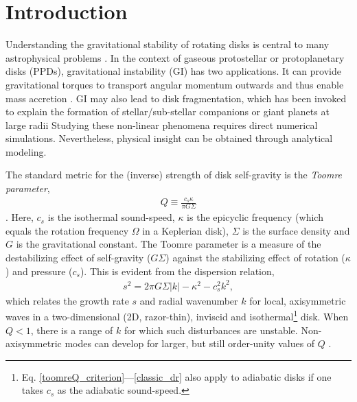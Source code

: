\documentclass[iop, numberedappendix]{emulateapj}
\begin{document}
\section{Introduction}\label{intro} 
Understanding the gravitational stability of rotating disks    
is central to many astrophysical problems {\bf \citep{kratter16}}. In the context of 
gaseous protostellar or protoplanetary disks (PPDs), gravitational instability (GI)
has two applications. It can provide gravitational torques to
transport angular momentum outwards and thus enable mass accretion
\citep{armitage10,turner14}. GI may also lead to disk fragmentation,
which has been invoked to explain the formation of stellar/sub-stellar companions or 
giant planets 
at large radii \citep{boss97,kratter06,stam09,helled14} %
Studying these non-linear phenomena requires
direct numerical simulations. Nevertheless, physical insight can be    
obtained through analytical modeling. 

The standard metric for the (inverse) strength of disk self-gravity is
the \emph{Toomre parameter}, 
\begin{align}\label{toomreQ_criterion}
  Q \equiv \frac{c_s\kappa}{\pi G \Sigma}  
\end{align}
\citep{toomre64}. Here, $c_s$ is the isothermal sound-speed,
$\kappa$ is the epicyclic frequency (which equals the rotation
frequency $\Omega$ in a Keplerian disk), $\Sigma$ is the surface
density and $G$ is the gravitational constant. The Toomre parameter is a
measure of the destabilizing effect of self-gravity ($G\Sigma$) against 
the stabilizing effect of rotation ($\kappa$) and pressure 
($c_s$). This is evident from the dispersion relation, 
\begin{align}\label{classic_dr}
  s^2 =  2\pi G\Sigma|k| - \kappa^2 - c_s^2k^2,   
\end{align}
which relates the growth rate $s$ and radial wavenumber $k$ for local,
axisymmetric waves in a two-dimensional (2D, razor-thin), inviscid and
isothermal\footnote{Eq. \ref{toomreQ_criterion}---\ref{classic_dr} also apply to adiabatic disks if one takes $c_s$ as the adiabatic sound-speed.} disk.  
When $Q<1$, there is a range of $k$ for which such disturbances are
unstable.  
Non-axisymmetric modes can develop for larger, but still order-unity
values of $Q$ 
\citep{lau78,papaloizou89,papaloizou91}. 
\end{document}
